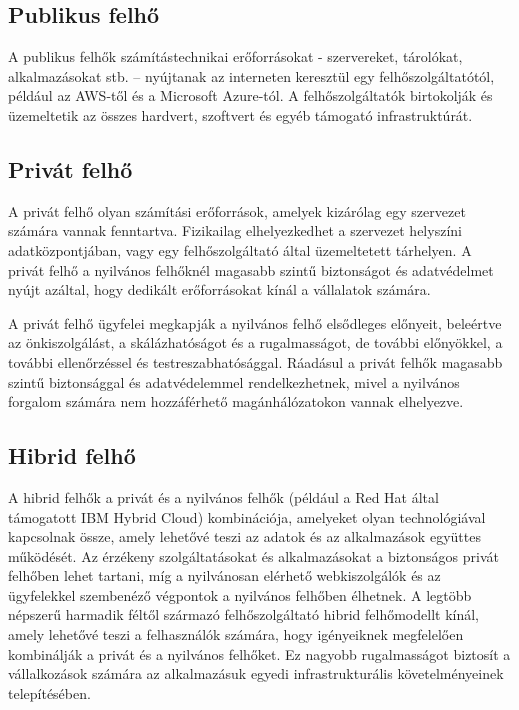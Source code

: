 \subsection{Publikus felhő}
A publikus felhők számítástechnikai erőforrásokat - szervereket, tárolókat, alkalmazásokat stb. -- nyújtanak az interneten keresztül egy felhőszolgáltatótól, például az AWS-től és a Microsoft Azure-tól. A felhőszolgáltatók birtokolják és üzemeltetik az összes hardvert, szoftvert és egyéb támogató infrastruktúrát.
\cite{cloudComp}

\subsection{Privát felhő}
A privát felhő olyan számítási erőforrások, amelyek kizárólag egy szervezet számára vannak fenntartva. Fizikailag elhelyezkedhet a szervezet helyszíni adatközpontjában, vagy egy felhőszolgáltató által üzemeltetett tárhelyen. A privát felhő a nyilvános felhőknél magasabb szintű biztonságot és adatvédelmet nyújt azáltal, hogy dedikált erőforrásokat kínál a vállalatok számára.

A privát felhő ügyfelei megkapják a nyilvános felhő elsődleges előnyeit, beleértve az önkiszolgálást, a skálázhatóságot és a rugalmasságot, de további előnyökkel, a további ellenőrzéssel és testreszabhatósággal. Ráadásul a privát felhők magasabb szintű biztonsággal és adatvédelemmel rendelkezhetnek, mivel a nyilvános forgalom számára nem hozzáférhető magánhálózatokon vannak elhelyezve.
\cite{cloudComp}

\subsection{Hibrid felhő}
A hibrid felhők a privát és a nyilvános felhők (például a Red Hat által támogatott IBM Hybrid Cloud) kombinációja, amelyeket olyan technológiával kapcsolnak össze, amely lehetővé teszi az adatok és az alkalmazások együttes működését. Az érzékeny szolgáltatásokat és alkalmazásokat a biztonságos privát felhőben lehet tartani, míg a nyilvánosan elérhető webkiszolgálók és az ügyfelekkel szembenéző végpontok a nyilvános felhőben élhetnek. A legtöbb népszerű harmadik féltől származó felhőszolgáltató hibrid felhőmodellt kínál, amely lehetővé teszi a felhasználók számára, hogy igényeiknek megfelelően kombinálják a privát és a nyilvános felhőket. Ez nagyobb rugalmasságot biztosít a vállalkozások számára az alkalmazásuk egyedi infrastrukturális követelményeinek telepítésében.
\cite{cloudComp}

